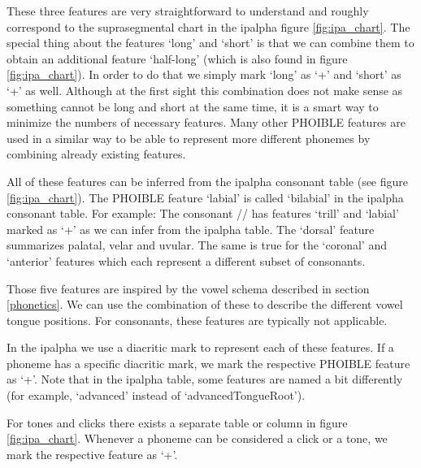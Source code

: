 \begin{description}[style=unboxed]
    \item[\textsc{stress, long, short}:] These three features are very straightforward to understand and roughly correspond to the suprasegmental chart in the \ac{ipalpha} figure \ref{fig:ipa_chart}. The special thing about the features `long' and `short' is that we can combine them to obtain an additional feature `half-long' (which is also found in figure \ref{fig:ipa_chart}). In order to do that we simply mark `long' as `+' and `short' as `+' as well. Although at the first sight this combination does not make sense as something cannot be long and short at the same time, it is a smart way to minimize the numbers of necessary features. Many other PHOIBLE features are used in a similar way to be able to represent more different phonemes by combining already existing features.
    
    \item[\textsc{tap, trill, lateral, labiodental, nasal, consonantal, labial, approximant, dorsal, coronal, anterior}:] All of these features can be inferred from the \ac{ipalpha} consonant table (see figure \ref{fig:ipa_chart}). The PHOIBLE feature `labial' is called `bilabial' in the \ac{ipalpha} consonant table. For example: The consonant // has features `trill' and `labial' marked as `+' as we can infer from the \ac{ipalpha} table. The `dorsal' feature summarizes palatal, velar and uvular. The same is true for the `coronal' and `anterior' features which each represent a different subset of consonants.
    
    \item[\textsc{round, high, low, front, back}:] Those five features are inspired by the vowel schema described in section \ref{phonetics}. We can use the combination of these to describe the different vowel tongue positions. For consonants, these features are typically not applicable.
    
    \item[\textsc{syllabic, retractedTongueRoot, advancedTongueRoot, raisedLarynxEjective, loweredLarynxImplosive}:] In the \ac{ipalpha} we use a diacritic mark to represent each of these features. If a phoneme has a specific diacritic mark, we mark the respective PHOIBLE feature as `+'. Note that in the \ac{ipalpha} table, some features are named a bit differently (for example, `advanced' instead of `advancedTongueRoot').
    
    \item[\textsc{tone, click}:] For tones and clicks there exists a separate table or column in figure \ref{fig:ipa_chart}. Whenever a phoneme can be considered a click or a tone, we mark the respective feature as `+'.
    

\end{description}
